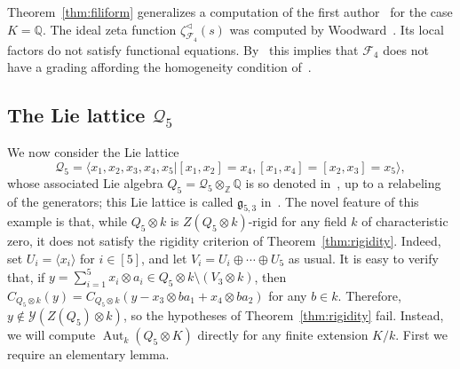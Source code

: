 \documentclass[11pt,a4paper]{amsart}
\theoremstyle{plain}
\theoremstyle{remark}
\newcommand{\Z}{\mathbb{Z}}
\newcommand{\Q}{\mathbb{Q}}
\newcommand{\tensor}{\otimes}
\DeclareMathOperator{\Aut}{Aut}
\begin{document}
Theorem~\ref{thm:filiform} generalizes a computation of the first author~\cite[\S3.3.11]{Berman/05} for the case $K = \Q$.  The ideal zeta function $\zeta^\vartriangleleft_{\mathcal{F}_4}(s)$ was computed by Woodward~\cite[Theorem~2.39]{duSWoodward/08}.  Its local factors do not satisfy functional equations.  By~\cite[Theorem~1.2]{Voll/17} this implies that $\mathcal{F}_4$ does not have a grading affording the homogeneity condition of~\cite[Condition~1.1]{Voll/17}.  

\subsection{The Lie lattice $\mathcal{Q}_5$} \label{sec:Q5}
We now consider the Lie lattice 
\begin{equation} \label{equ:Q5.present}
\mathcal{Q}_5 = \langle x_1, x_2, x_3, x_4, x_5 | [x_1,x_2] = x_4, [x_1, x_4] = [x_2, x_3] = x_5 \rangle,
\end{equation}
whose associated Lie algebra $Q_5 = \mathcal{Q}_5 \tensor_\Z \Q$ is so denoted in~\cite[\S3.3.12]{Berman/05}, up to a relabeling of the generators; this Lie lattice is called $\mathfrak{g}_{5,3}$ in~\cite[\S2.14]{duSWoodward/08}.  The novel feature of this example is that, while $Q_5 \tensor k$ is $Z(Q_5 \tensor k)$-rigid for any field $k$ of characteristic zero, it does not satisfy the rigidity criterion of Theorem~\ref{thm:rigidity}.  Indeed, set $U_i = \langle x_i \rangle$ for $i \in [5]$, and let $V_i = U_i \oplus \cdots \oplus U_5$ as usual.  It is easy to verify that, if $y = \sum_{i = 1}^5 x_i \tensor a_i \in Q_5 \tensor k \setminus (V_3  \tensor k)$, then $C_{Q_5 \tensor k}(y) = C_{Q_5 \tensor k}(y - x_3 \tensor ba_1 + x_4 \tensor ba_2)$ for any $b \in k$.  Therefore, $y \not\in \mathcal{Y}(Z(Q_5) \tensor k)$, so the hypotheses of Theorem~\ref{thm:rigidity} fail.  Instead, we will compute $\Aut_k(Q_5 \tensor K)$ directly for any finite extension $K/k$.  First we require an elementary lemma.
\end{document}
